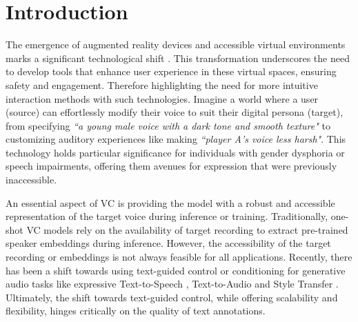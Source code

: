 \documentclass{Interspeech2024}
\begin{document}
\section{Introduction}

% 




The emergence of augmented reality devices and accessible virtual environments marks a significant technological shift \cite{hamad2022virtual, hupont2023next}. This transformation underscores the need to develop tools that enhance user experience in these virtual spaces, ensuring safety and engagement. Therefore highlighting the need for more intuitive interaction methods with such technologies. Imagine a world where a user (source) can effortlessly modify their voice to suit their digital persona (target), from specifying \textit{``a young male voice with a dark tone and smooth texture"} to customizing auditory experiences like making \textit{``player A's voice less harsh"}. This technology holds particular significance for individuals with gender dysphoria or speech impairments, offering them avenues for expression that were previously inaccessible.

An essential aspect of VC is providing the model with a robust and accessible representation of the target voice during inference or training. Traditionally, one-shot VC models rely on the availability of target recording to extract pre-trained speaker embeddings \cite{sisman2020overview, qian2019autovc, qian2020f0, nercessian2020improved} during inference. However, the accessibility of the target recording or embeddings is not always feasible for all applications. Recently, there has been a shift towards using text-guided control or conditioning for generative audio tasks like expressive Text-to-Speech \cite{shimizu2023prompttts++, zhang2023promptspeaker}, Text-to-Audio \cite{huang2023make} and Style Transfer \cite{yao2023promptvc}. Ultimately, the shift towards text-guided control, while offering scalability and flexibility, hinges critically on the quality of text annotations. 
\end{document}
